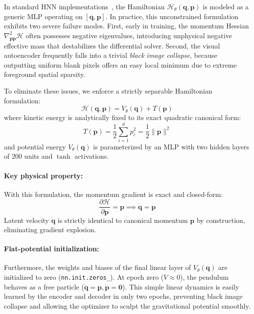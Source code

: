 \documentclass[11pt]{article}
\begin{document}
In standard HNN implementations~\cite{greydanus2019hamiltonian}, the Hamiltonian $\mathcal{H}_\theta(\mathbf{q}, \mathbf{p})$ is modeled as a generic MLP operating on $[\mathbf{q}, \mathbf{p}]$. In practice, this unconstrained formulation exhibits two severe failure modes. First, early in training, the momentum Hessian $\nabla^2_{\mathbf{p}\mathbf{p}} \mathcal{H}$ often possesses negative eigenvalues, introducing unphysical negative effective mass that destabilizes the differential solver. Second, the visual autoencoder frequently falls into a trivial \textit{black image collapse}, because outputting uniform blank pixels offers an easy local minimum due to extreme foreground spatial sparsity.

To eliminate these issues, we enforce a strictly separable Hamiltonian formulation:
\begin{equation}
    \mathcal{H}(\mathbf{q}, \mathbf{p}) = V_\theta(\mathbf{q}) + T(\mathbf{p})
\end{equation}
where kinetic energy is analytically fixed to its exact quadratic canonical form:
\begin{equation}
    T(\mathbf{p}) = \frac{1}{2} \sum_{i=1}^d p_i^2 = \frac{1}{2} \|\mathbf{p}\|^2
\end{equation}
and potential energy $V_\theta(\mathbf{q})$ is parameterized by an MLP with two hidden layers of 200 units and $\tanh$ activations.

\paragraph{Key physical property:} 
With this formulation, the momentum gradient is exact and closed-form:
\begin{equation}
    \frac{\partial \mathcal{H}}{\partial \mathbf{p}} = \mathbf{p} \implies \dot{\mathbf{q}} = \mathbf{p}
\end{equation}
Latent velocity $\dot{\mathbf{q}}$ is strictly identical to canonical momentum $\mathbf{p}$ by construction, eliminating gradient explosion.

\paragraph{Flat-potential initialization:} 
Furthermore, the weights and biases of the final linear layer of $V_\theta(\mathbf{q})$ are initialized to zero (\texttt{nn.init.zeros\_}). At epoch zero ($V \approx 0$), the pendulum behaves as a free particle ($\dot{\mathbf{q}} = \mathbf{p}, \dot{\mathbf{p}} = \mathbf{0}$). This simple linear dynamics is easily learned by the encoder and decoder in only two epochs, preventing black image collapse and allowing the optimizer to sculpt the gravitational potential smoothly.
\end{document}
